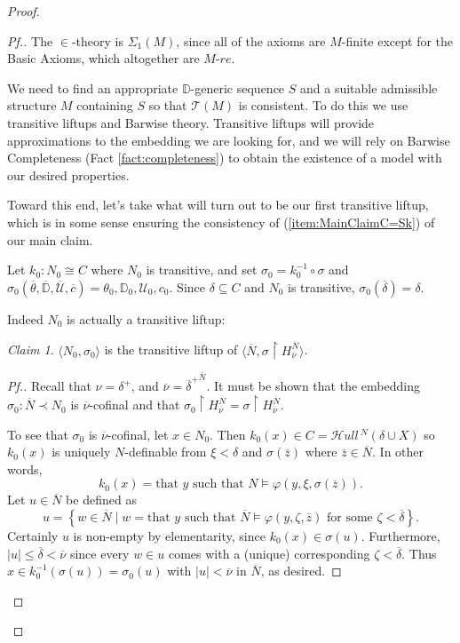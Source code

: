 \documentclass{amsart}
\theoremstyle{definition}
\theoremstyle{remark}
\newtheorem{claimno}{Claim}
\newcommand{\D}{\mathbb{D}}
\newcommand{\N}{{\overline{N}}}
\newcommand{\U}{\mathcal{U}}
\newcommand{\st}{\; | \;}
\newcommand{\set}[2]{\left\{#1\st #2 \right\}}
\newcommand{\SH}{\mathcal{H}\textit{ull} \,}
\newcommand{\Sk}[3]{\SH^{#1}( {#2} \cup {#3} ) }
\begin{document}
\begin{proof}
\begin{proof}[Pf.]
The $\in$-theory is $\Sigma_1(M)$, since all of the axioms are $M$-finite except for the \textsf{Basic Axioms}, which altogether are $M$-$re$.

We need to find an appropriate $\D$-generic sequence $S$ and a suitable admissible structure $M$ containing $S$ so that $\mathcal T(M)$ is consistent. To do this we use transitive liftups and Barwise theory. Transitive liftups will provide approximations to the embedding we are looking for, and we will rely on Barwise Completeness (Fact \ref{fact:completeness}) to obtain the existence of a model with our desired properties. 

Toward this end, let's take what will turn out to be our first transitive liftup, which is in some sense ensuring the consistency of (\ref{item:MainClaimC=Sk}) of our main claim.

Let $k_0 : N_0 \cong C$ where $N_0$ is transitive, and set $\sigma_0 = k_0^{-1} \circ \sigma$ and $\sigma_0(\overline \theta, \overline{\D}, \overline{\U}, \overline c) = \theta_0, \D_0, \U_0, c_0.$
Since $\delta \subseteq C$ and $N_0$ is transitive, $\sigma_0(\overline \delta)=\delta$. 

Indeed $N_0$ is actually a transitive liftup:

\begin{claimno} \label{claim:N0isliftupofN} $\langle N_0, \sigma_0 \rangle$ is the transitive liftup of $\langle \N, \sigma \upharpoonright H_{\overline \nu}^{\N} \rangle$. \end{claimno}
\begin{proof}[Pf.] Recall that $\nu=\delta^+$, and $\overline \nu={\overline \delta^+}^{\N}$. It must be shown that the embedding $\sigma_0: \overline N \prec N_0$ is $\overline \nu$-cofinal and that $\sigma_0 \upharpoonright H_{\overline \nu}^{\N}=\sigma \upharpoonright H_{\overline \nu}^{\overline N}$. 

To see that $\sigma_0$ is $\overline \nu$-cofinal, let $x \in N_0$. Then $k_0(x) \in C = \Sk{N}{\delta}{X}$ so $k_0(x)$ is uniquely $N$-definable from $\xi < \delta$ and $\sigma(\overline z)$ where $\overline z \in \N$. In other words, $$k_0(x) = \text{that } y \text{ such that } N \models \varphi(y, \xi, \sigma(\overline z)).$$ Let $u \in \N$ be defined as 
	$$u=\set{ w \in \N }{  w=\text{that } y \text{ such that } \N \models \varphi(y, \zeta, \overline z) \text{ for some } \zeta < \overline \delta }.$$
Certainly $u$ is non-empty by elementarity, since $k_0(x) \in \sigma(u).$
Furthermore, $|u| \leq \overline \delta < \overline \nu$ since every $w \in u$ comes with a (unique) corresponding $\zeta<\overline \delta$.
Thus $x \in k_0^{-1}(\sigma(u))=\sigma_0(u)$ with $|u| < \overline \nu$ in $\N$, as desired. 


\end{proof}
\end{proof}
\end{proof}
\end{document}
